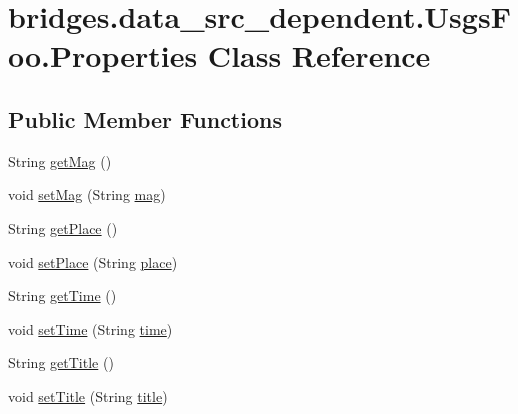 \hypertarget{classbridges_1_1data__src__dependent_1_1_usgs_foo_1_1_properties}{}\section{bridges.\+data\+\_\+src\+\_\+dependent.\+Usgs\+Foo.\+Properties Class Reference}
\label{classbridges_1_1data__src__dependent_1_1_usgs_foo_1_1_properties}
\subsection*{Public Member Functions}
\begin{DoxyCompactItemize}
\item 
String \mbox{\hyperlink{classbridges_1_1data__src__dependent_1_1_usgs_foo_1_1_properties_a9dcb3ec22a3aaa828d79c7a41b1d9685}{get\+Mag}} ()
\item 
void \mbox{\hyperlink{classbridges_1_1data__src__dependent_1_1_usgs_foo_1_1_properties_aac22cfb93d78259f098f4f996313429c}{set\+Mag}} (String \mbox{\hyperlink{classbridges_1_1data__src__dependent_1_1_usgs_foo_1_1_properties_a114163b5773ae63dc7554d0fb365f540}{mag}})
\item 
String \mbox{\hyperlink{classbridges_1_1data__src__dependent_1_1_usgs_foo_1_1_properties_ae97633cdfd1a3c6420ea7c38ed4155a2}{get\+Place}} ()
\item 
void \mbox{\hyperlink{classbridges_1_1data__src__dependent_1_1_usgs_foo_1_1_properties_a62e8d04129240c4f04b880ab2fef1f04}{set\+Place}} (String \mbox{\hyperlink{classbridges_1_1data__src__dependent_1_1_usgs_foo_1_1_properties_a78104fd6df6eec29b1598669127df9ed}{place}})
\item 
String \mbox{\hyperlink{classbridges_1_1data__src__dependent_1_1_usgs_foo_1_1_properties_abf80c8378da2b28708f49e9cf5bdf2d8}{get\+Time}} ()
\item 
void \mbox{\hyperlink{classbridges_1_1data__src__dependent_1_1_usgs_foo_1_1_properties_a846ac9ec8c49cd261a7dec80844fef27}{set\+Time}} (String \mbox{\hyperlink{classbridges_1_1data__src__dependent_1_1_usgs_foo_1_1_properties_a6e42210e723e44d15bcea954ccd6b579}{time}})
\item 
String \mbox{\hyperlink{classbridges_1_1data__src__dependent_1_1_usgs_foo_1_1_properties_a730443f40e47ba5ca0ed1c7005153ed2}{get\+Title}} ()
\item 
void \mbox{\hyperlink{classbridges_1_1data__src__dependent_1_1_usgs_foo_1_1_properties_aa22752d66c3427eac4559a24a79a6cd8}{set\+Title}} (String \mbox{\hyperlink{classbridges_1_1data__src__dependent_1_1_usgs_foo_1_1_properties_a8ffe112286f04d57850831222e1c50d6}{title}})

\end{DoxyCompactItemize}
